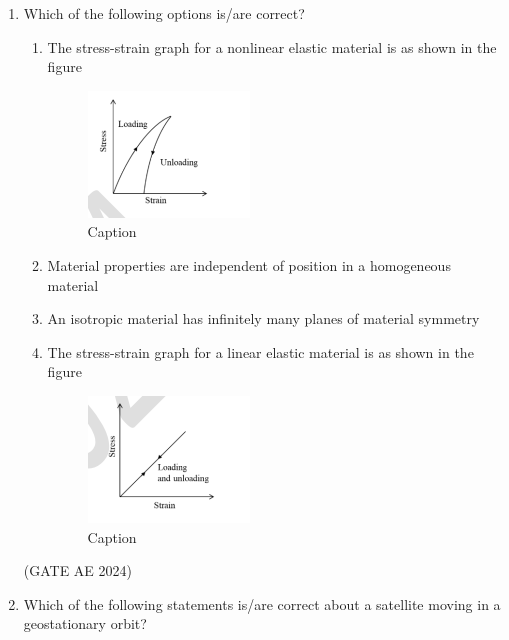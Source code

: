 \documentclass[journal,12pt,onecolumn]{IEEEtran}
\theoremstyle{remark}
\begin{document}
\begin{enumerate}
\item Which of the following options is/are correct?  

\begin{enumerate}
\item The stress-strain graph for a nonlinear elastic material is as shown in the figure  

\begin{figure}[H]
    \centering
    \includegraphics[width=0.5\columnwidth]{figs/Screenshot from 2025-08-23 15-55-50.png}
    \caption{Caption}
    \label{fig:placeholder}
\end{figure}

\item Material properties are independent of position in a homogeneous material  
\item An isotropic material has infinitely many planes of material symmetry  
\item The stress-strain graph for a linear elastic material is as shown in the figure  

\begin{figure}[H]
    \centering
    \includegraphics[width=0.5\columnwidth]{figs/Screenshot from 2025-08-23 15-56-46.png}
    \caption{Caption}
    \label{fig:placeholder}
\end{figure}

\end{enumerate}
\hfill(GATE AE 2024)

\item Which of the following statements is/are correct about a satellite moving in a geostationary orbit?  


\end{enumerate}
\end{document}
